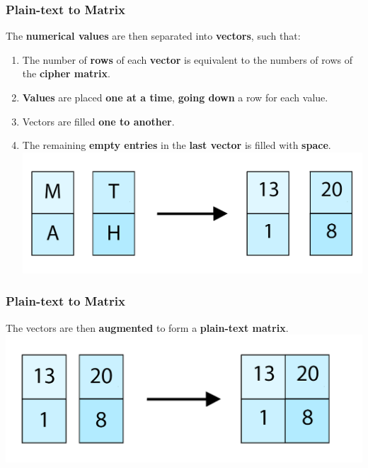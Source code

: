 \documentclass[11pt]{beamer}
\begin{document}
\begin{frame}\frametitle{Plain-text to Matrix}

\small The \textbf{numerical values} are then separated into \textbf{vectors}, such that:\\
\begin{enumerate}[a]

\item \scriptsize The number of \textbf{rows} of each \textbf{vector} is equivalent to the numbers of rows of the \textbf{cipher matrix}. \par
\item \textbf{Values} are placed \textbf{one at a time}, \textbf{going down} a row for each value.
\item Vectors are filled \textbf{one to another}.
\item The remaining \textbf{empty entries} in the \textbf{last vector} is filled with \textbf{space}.
\center \includegraphics[scale=0.2]{math_1.png}

\end{enumerate}
\end{frame}

\begin{frame}\frametitle{Plain-text to Matrix}

The vectors are then \textbf{augmented} to form a \textbf{plain-text matrix}.
\center \includegraphics[scale=0.2]{MATH.png}

\end{frame}
\end{document}
